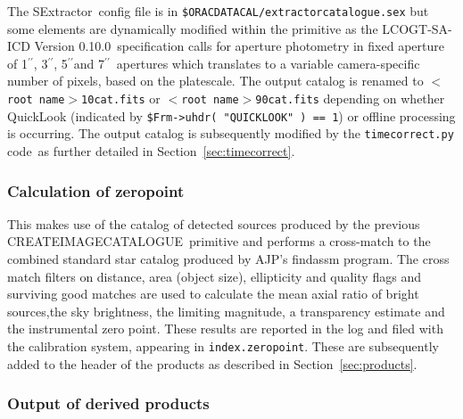\documentclass[twoside,11pt]{article}
\renewcommand{\_}{\texttt{\symbol{95}}}
\newcommand{\SEx}{{\sc SExtractor}}
\newcommand{\task}[1]{\textsf{#1}}
\newcommand{\SAICD}{LCOGT-SA-ICD Version 0.10.0}
\newcommand{\Ast}{\texttt{timecorrect.py} code}
\newcommand{\arcsec}{\mbox{$^{\prime \prime}$}}
\begin{document}
The \SEx\ config file is in \texttt{\$ORAC\_DATA\_CAL/extractor\_catalogue.sex}
but some elements are dynamically modified within the primitive as the \SAICD\
specification calls for aperture photometry in fixed aperture of 1\arcsec,
3\arcsec, 5\arcsec and 7\arcsec\ apertures which translates to a variable
camera-specific number of pixels, based on the platescale. The output catalog is
renamed to \texttt{$<$root name$>$10\_cat.fits} or \texttt{$<$root
name$>$90\_cat.fits} depending on whether QuickLook (indicated by
\texttt{\$Frm->uhdr( "QUICK\_LOOK" ) == 1}) or offline processing is occurring.
The output catalog is subsequently modified by the \Ast\ as further detailed in
Section~\ref{sec:timecorrect}.

\subsubsection{Calculation of zeropoint}

This makes use of the catalog of detected sources produced by the previous
\task{\_CREATE\_IMAGE\_CATALOGUE\_}\ primitive and performs a cross-match to the
combined standard star catalog produced by AJP's \task{findassm} program. The
cross match filters on distance, area (object size), ellipticity and quality
flags and surviving good matches are used to calculate the mean axial ratio of
bright sources,the sky brightness, the limiting magnitude, a transparency
estimate and the instrumental zero point. These results are reported in the log
and filed with the calibration system, appearing in \texttt{index.zeropoint}.
These are subsequently added to the header of the products as described in
Section~\ref{sec:products}.

\subsubsection{Output of derived products}
\protect\label{sec:products}
\end{document}
